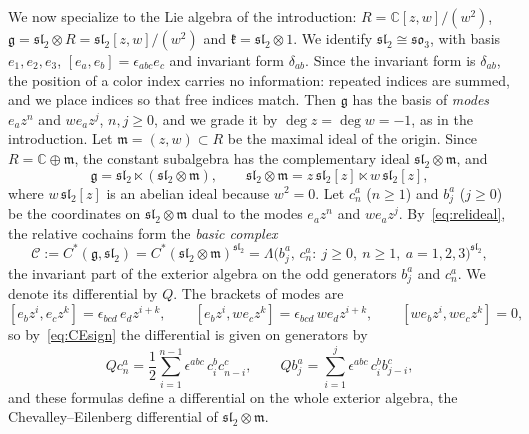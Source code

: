 \documentclass[11pt]{amsart}
\numberwithin{equation}{section}
\theoremstyle{definition}
\theoremstyle{remark}
\newcommand{\C}{\mathbb{C}}
\newcommand{\g}{\mathfrak{g}}
\newcommand{\sltwo}{\mathfrak{sl}_2}
\newcommand{\cC}{\mathcal{C}}
\begin{document}
We now specialize to the Lie algebra of the introduction: $R=\C[z,w]/(w^2)$, $\g=\sltwo\otimes R=\sltwo[z,w]/(w^2)$ and $\mathfrak k=\sltwo\otimes1$. We identify $\sltwo\cong\mathfrak{so}_3$, with basis $e_1,e_2,e_3$, $[e_a,e_b]=\epsilon_{abc}e_c$ and invariant form $\delta_{ab}$. Since the invariant form is $\delta_{ab}$, the position of a color index carries no information: repeated indices are summed, and we place indices so that free indices match. Then $\g$ has the basis of \emph{modes} $e_az^n$ and $we_az^j$, $n,j\ge0$, and we grade it by $\deg z=\deg w=-1$, as in the introduction. Let $\mathfrak m=(z,w)\subset R$ be the maximal ideal of the origin. Since $R=\C\oplus\mathfrak m$, the constant subalgebra has the complementary ideal $\sltwo\otimes\mathfrak m$, and
\begin{equation}\label{eq:g-decomp}
\g=\sltwo\ltimes(\sltwo\otimes\mathfrak m),\qquad \sltwo\otimes\mathfrak m=z\,\sltwo[z]\ltimes w\,\sltwo[z],
\end{equation}
where $w\,\sltwo[z]$ is an abelian ideal because $w^2=0$. Let $c_n^a$ ($n\ge1$) and $b_j^a$ ($j\ge0$) be the coordinates on $\sltwo\otimes\mathfrak m$ dual to the modes $e_az^n$ and $we_az^j$. By~\eqref{eq:relideal}, the relative cochains form the \emph{basic complex}
\begin{equation}\label{eq:C}
\cC:=C^*(\g,\sltwo)=C^*(\sltwo\otimes\mathfrak m)^{\sltwo}=\Lambda\bigl(b_j^a,\,c_n^a:\ j\ge0,\ n\ge1,\ a=1,2,3\bigr)^{\sltwo},
\end{equation}
the invariant part of the exterior algebra on the odd generators $b_j^a$ and $c_n^a$. We denote its differential by $Q$. The brackets of modes are
\begin{equation}\label{eq:mode-brackets}
[e_bz^i,e_cz^k]=\epsilon_{bcd}\,e_dz^{i+k},\qquad [e_bz^i,we_cz^k]=\epsilon_{bcd}\,we_dz^{i+k},\qquad [we_bz^i,we_cz^k]=0,
\end{equation}
so by~\eqref{eq:CEsign} the differential is given on generators by
\begin{equation}\label{eq:Q}
Qc_n^a=\frac12\sum_{i=1}^{n-1}\epsilon^{abc}\,c_i^bc_{n-i}^c,\qquad
Qb_j^a=\sum_{i=1}^{j}\epsilon^{abc}\,c_i^bb_{j-i}^c,
\end{equation}
and these formulas define a differential on the whole exterior algebra, the Chevalley--Eilenberg differential of $\sltwo\otimes\mathfrak m$.
\end{document}

